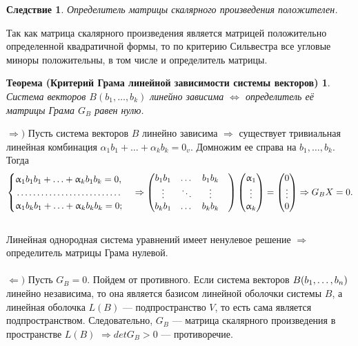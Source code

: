 \newtheorem*{cor14_1_2}{Следствие}\begin{cor14_1_2}Определитель матрицы скалярного произведения положителен.
\end{cor14_1_2}\begin{Proof}
	Так как матрица скалярного произведения является матрицей положительно определенной квадратичной формы, то по критерию Сильвестра все угловые миноры положительны, в том числе и определитель матрицы.
\end{Proof}
\newtheorem*{th14_1_2}{Теорема (Критерий Грама линейной зависимости системы векторов)}\begin{th14_1_2}Система
	векторов $B(b_1,\dots,b_k)$ линейно зависима $\Longleftrightarrow$ определитель её
	матрицы Грама $G_B$ равен нулю.
\end{th14_1_2}\begin{Proof}
	$\Rightarrow)$ Пусть система векторов $B$ линейно зависима $\Rightarrow$ существует тривиальная линейная комбинация $\alpha_1 b_1+ \ldots +\alpha_k b_k =0_v$. Домножим ее справа на $b_1,\dots,b_k$. Тогда\\
	$$\begin{cases}	\alpha_1b_1b_1+ \ldots +\alpha_kb_1 b_k=0,\\
		\dotfill\\
		\alpha_1b_k b_1+ \ldots +\alpha_kb_k b_k=0;\\
	\end{cases}\Rightarrow\begin{pmatrix}
		b_1 b_1 & \dots & b_1 b_k\\
		\vdots&\ddots&\vdots&\\
		b_k b_1 &\dots&b_k b_k
	\end{pmatrix}\begin{pmatrix}
		\alpha_1\\
		\vdots\\
		\alpha_k
	\end{pmatrix} = \begin{pmatrix}
		0\\
		\vdots\\
		0
	\end{pmatrix}\Rightarrow G_B X = 0.$$\\ Линейная однородная система уравнений имеет ненулевое решение $\Rightarrow$ определитель матрицы Грама нулевой.\\\\
	$\Leftarrow)$ Пусть $G_B = 0$. Пойдем от противного. Если система векторов $B(b_1,\dots,b_n)$ линейно независима, то она является базисом линейной оболочки системы $B$, а линейная оболочка $L(B)$ --- подпространство $V$, то есть сама является подпространством. Следовательно, $G_B$ --- матрица скалярного произведения в пространстве $L(B)$ $\Rightarrow detG_B > 0$ --- противоречие.
\end{Proof}

